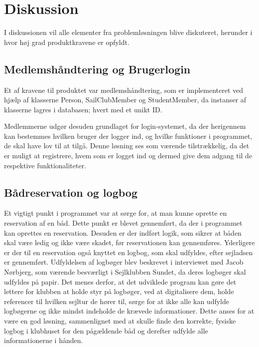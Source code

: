 \chapter{Diskussion}\label{chap:diskussion}

I diskussionen vil alle elementer fra problemløsningen blive diskuteret, herunder i hvor høj grad produktkravene er opfyldt.


\section*{Medlemshåndtering og Brugerlogin}

Et af kravene til produktet var medlemshåndtering, som er implementeret ved hjælp af klasserne Person, SailClubMember og StudentMember, da instanser af klasserne lagres i databasen; hvert med et unikt ID.

Medlemmerne udgør desuden grundlaget for login-systemet, da der herigennem kan bestemmes hvilken bruger der logger ind, og hvilke funktioner i programmet, de skal have lov til at tilgå.  
Denne løsning ses som værende tilstrækkelig, da det er muligt at registrere, hvem som er logget ind og dermed give dem adgang til de respektive funktionaliteter. 


\section*{Bådreservation og logbog}

Et vigtigt punkt i programmet var at sørge for, at man kunne oprette en reservation af en båd. 
Dette punkt er blevet gennemført, da der i programmet kan oprettes en reservation. 
Desuden er der indført logik, som sikrer at båden skal være ledig og ikke være skadet, før reservationen kan gennemføres.
Yderligere er der til en reservation også knyttet en logbog, som skal udfyldes, efter sejladsen er gennemført. 
Udfyldelsen af logbøger blev beskrevet i interviewet med Jacob Nørbjerg, som værende besværligt i Sejlklubben Sundet, da deres logbøger skal udfyldes på papir. 
Det menes derfor, at det udviklede program kan gøre det lettere for klubben at holde styr på logbøger, ved at digitalisere dem, holde referencer til hvilken sejltur de hører til, sørge for at ikke alle kan udfylde logbøgerne og ikke mindst indeholde de krævede informationer. 
Dette anses for at være en god løsning, sammenlignet med at skulle finde den korrekte, fysiske logbog i klubhuset for den pågældende båd og derefter udfylde alle informationerne i hånden. 


